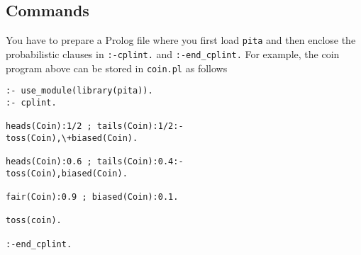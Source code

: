 \documentclass[a4paper,10pt]{article}
\begin{document}
\subsection{Commands}

You have to prepare a Prolog file where you first load \texttt{pita} and then enclose the probabilistic 
clauses in \texttt{:-cplint.} and \texttt{:-end\_cplint.} For example, the coin program above can be stored in \texttt{coin.pl} as follows
\begin{verbatim}
:- use_module(library(pita)).
:- cplint.

heads(Coin):1/2 ; tails(Coin):1/2:- 
toss(Coin),\+biased(Coin).

heads(Coin):0.6 ; tails(Coin):0.4:- 
toss(Coin),biased(Coin).

fair(Coin):0.9 ; biased(Coin):0.1.

toss(coin).

:-end_cplint.
\end{verbatim}
\end{document}
